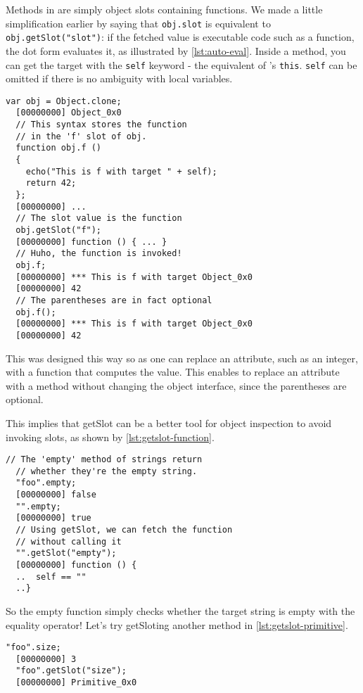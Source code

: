 \documentclass[openright,twoside,12pt]{report}
\begin{document}
Methods in \urbi are simply object slots containing functions. We made
a little simplification earlier by saying that \lstinline|obj.slot| is
equivalent to \lstinline|obj.getSlot("slot")|: if the fetched value is
executable code such as a function, the dot form evaluates it, as
illustrated by \autoref{lst:auto-eval}. Inside a method, you can get the
target with the \lstinline|self| keyword - the equivalent of \Cxx's
\texttt{this}. \lstinline|self| can be omitted if there is no
ambiguity with local variables.

\begin{lstlisting}[caption=Function in object are automatically evaluated,
  label=lst:auto-eval]
  var obj = Object.clone;
  [00000000] Object_0x0
  // This syntax stores the function
  // in the 'f' slot of obj.
  function obj.f ()
  {
    echo("This is f with target " + self);
    return 42;
  };
  [00000000] ...
  // The slot value is the function
  obj.getSlot("f");
  [00000000] function () { ... }
  // Huho, the function is invoked!
  obj.f;
  [00000000] *** This is f with target Object_0x0
  [00000000] 42
  // The parentheses are in fact optional
  obj.f();
  [00000000] *** This is f with target Object_0x0
  [00000000] 42
\end{lstlisting}

This was designed this way so as one can replace an attribute, such as
an integer, with a function that computes the value. This enables to
replace an attribute with a method without changing the object
interface, since the parentheses are optional.

This implies that getSlot can be a better tool for object inspection
to avoid invoking slots, as shown by \autoref{lst:getslot-function}.

\begin{lstlisting}[caption=Inspecting executable slots with \texttt{getSlot},
  label=lst:getslot-function]
  // The 'empty' method of strings return
  // whether they're the empty string.
  "foo".empty;
  [00000000] false
  "".empty;
  [00000000] true
  // Using getSlot, we can fetch the function
  // without calling it
  "".getSlot("empty");
  [00000000] function () {
  ..  self == ""
  ..}
\end{lstlisting}

So the empty function simply checks whether the target string is empty
with the equality operator! Let's try getSloting another method in
\autoref{lst:getslot-primitive}.

\begin{lstlisting}[caption=Primitives, label=lst:getslot-primitive]
  "foo".size;
  [00000000] 3
  "foo".getSlot("size");
  [00000000] Primitive_0x0
\end{lstlisting}
\end{document}
